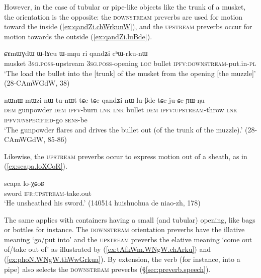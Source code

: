 However, in the case of tubular or pipe-like objects like the trunk of a musket, the orientation is the opposite: the \textsc{downstream} preverbs are used for motion toward the inside (\ref{ex:qandZi.chWrkunW}), and the \textsc{upstream} preverbs occur for motion towards the outside (\ref{ex:qandZi.luBde}).

\begin{exe}
\ex \label{ex:qandZi.chWrkunW}
\gll  ɕɤmɯɣdɯ ɯ-lɤcu ɯ-mŋu ri qandʑi cʰɯ-rku-nɯ \\
musket \textsc{3sg}.\textsc{poss}-upstream \textsc{3sg}.\textsc{poss}-opening \textsc{loc} bullet \textsc{ipfv}:\textsc{downstream}-put.in-\textsc{pl} \\
\glt `The load the bullet into the [trunk] of the musket from the opening [the muzzle]' (28-CAmWGdW, 38)
\end{exe}

\begin{exe}
\ex \label{ex:qandZi.luBde}
\gll nɯnɯ mɯzi nɯ tu-nɯt tɕe tɕe qandʑi nɯ lu-βde tɕe ju-ɕe ɲɯ-ŋu \\
\textsc{dem} gunpowder \textsc{dem} \textsc{ipfv}-burn \textsc{lnk} \textsc{lnk} bullet \textsc{dem} \textsc{ipfv}:\textsc{upstream}-throw \textsc{lnk} \textsc{ipfv}:\textsc{unspecified}-go \textsc{sens}-be \\
\glt `The gunpowder flares and drives the bullet out (of the trunk of the muzzle).' (28-CAmWGdW, 85-86)
\end{exe}

Likewise, the \textsc{upstream} preverbs occur to express motion out of a sheath, as in (\ref{ex:scapa.loXCoR}).

\begin{exe}
\ex \label{ex:scapa.loXCoR}
\gll  scapa lo-χɕoʁ \\
sword \textsc{ifr}:\textsc{upstream}-take.out  \\
\glt `He unsheathed his sword.' (140514 huishuohua de niao-zh, 178)
\end{exe}

The same applies with containers having a small (and tubular) opening, like bags or bottles for instance. The \textsc{downstream} orientation preverbs have the illative meaning `go/put into' and the \textsc{upstream} preverbs the elative meaning `come out of/take out of' as illustrated by (\ref{ex:tAfkWm.WNgW.chArku}) and  (\ref{ex:phoN.WNgW.thWwGrkua}). By extension, the verb  (for instance, into a pipe) also selects the \textsc{downstream} preverbs (§\ref{sec:preverb.speech}).


